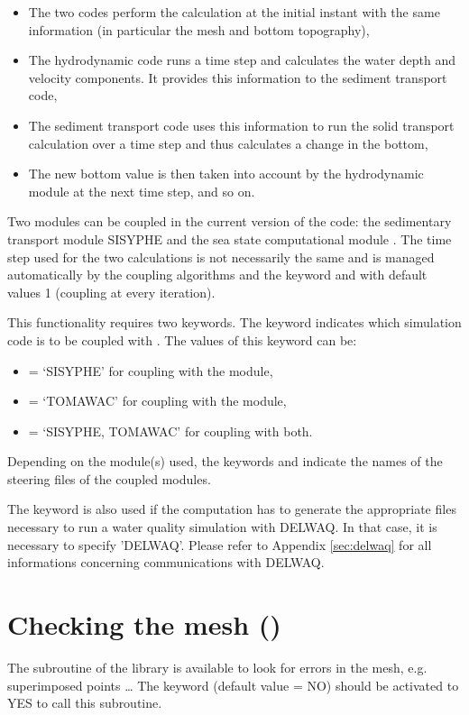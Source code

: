 \begin{itemize}
\item  The two codes perform the calculation at the initial instant with the
same information (in particular the mesh and bottom topography),

\item  The hydrodynamic code runs a time step and calculates the water depth
and velocity components. It provides this information to the sediment transport
code,

\item  The sediment transport code uses this information to run the solid
transport calculation over a time step and thus calculates a change in the
bottom,

\item  The new bottom value is then taken into account by the hydrodynamic
module at the next time step, and so on.
\end{itemize}

Two modules can be coupled in the current version of the code: the sedimentary
transport module SISYPHE and the sea state computational module \tomawac. The
time step used for the two calculations is not necessarily the same and is
managed automatically by the coupling algorithms and the keyword
 and 
with default values 1 (coupling at every iteration).

This functionality requires two keywords. The keyword 
indicates which simulation code is to be coupled with . The values of
this keyword can be:

\begin{itemize}
\item  {}= `SISYPHE' for coupling with the \sisyphe module,

\item  {}= `TOMAWAC' for coupling with the \tomawac module,

\item  {}= `SISYPHE, TOMAWAC' for coupling with both.
\end{itemize}

Depending on the module(s) used, the keywords  and  indicate the names of the steering files
of the coupled modules.

The keyword  is also used if the computation has to
generate the appropriate files necessary to run a water quality simulation with
DELWAQ. In that case, it is necessary to specify 'DELWAQ'. Please refer to Appendix \ref{sec:delwaq} for all informations
concerning communications with DELWAQ.

\section{Checking the mesh ()}

The subroutine  of the \bief library is available to look for
errors in the mesh, e.g. superimposed points \ldots
The keyword  (default value = NO) should be activated
to YES to call this subroutine.